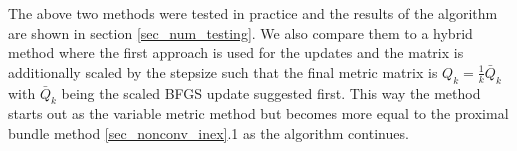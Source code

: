
%
%

The above two methods were tested in practice and the results of the algorithm are shown in section \ref{sec_num_testing}. We also compare them to a hybrid method where the first approach is used for the updates and the matrix is additionally scaled by the stepsize such that the final metric matrix is \(Q_k = \frac{1}{k}\bar{Q}_k\) with \(\bar{Q}_k\) being the scaled BFGS update suggested first. This way the method starts out as the variable metric method but becomes more equal to the proximal bundle method \ref{sec_nonconv_inex}.1 as the algorithm continues.

